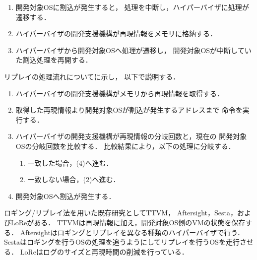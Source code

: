 \documentclass[submit,techreq,noauthor,dvipdfmx]{ipsj}
\begin{document}
\begin{description}
        \begin{enumerate}
            \item 
                開発対象OSに割込が発生すると，
                処理を中断し，ハイパーバイザに処理が遷移する．
            \item 
                ハイパーバイザの開発支援機構が再現情報をメモリに格納する．
            \item 
                ハイパーバイザから開発対象OSへ処理が遷移し，
                開発対象OSが中断していた割込処理を再開する．
        \end{enumerate}

        リプレイの処理流れについてに示し，
        以下で説明する．

        \begin{enumerate}
            \item 
                ハイパーバイザの開発支援機構がメモリから再現情報を取得する．
            \item 
                取得した再現情報より開発対象OSが割込が発生するアドレスまで
                命令を実行する．
            \item 
                ハイパーバイザの開発支援機構が再現情報の分岐回数と，現在の
                開発対象OSの分岐回数を比較する．
                比較結果により，以下の処理に分岐する．
                \begin{enumerate}
                    \item 一致した場合，(4)へ進む．
                    \item 一致しない場合，(2)へ進む．
                \end{enumerate}
            \item 
                開発対象OSへ割込が発生する．
        \end{enumerate}

        ロギング/リプレイ法を用いた既存研究としてTTVM\cite{samuel}，
        Aftersight\cite{jim}，Sesta\cite{kawasaki}，およびLoRe\cite{li2013lore}がある．
        TTVMは再現情報に加え，開発対象OS側のVMの状態を保存する．
        Aftersightはロギングとリプレイを異なる種類のハイパーバイザで行う．
        Sestaはロギングを行うOSの処理を追うようにしてリプレイを行うOSを走行させる．
        LoReはログのサイズと再現時間の削減を行っている．
\end{description}
\end{document}
